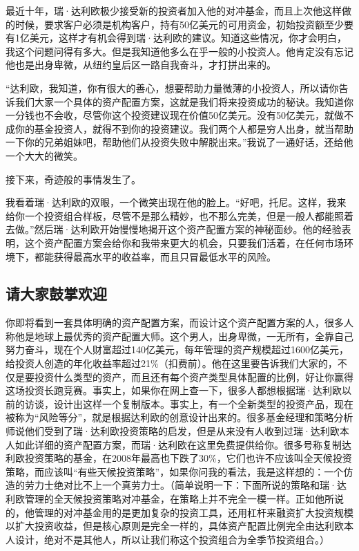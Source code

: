 最近十年，瑞·达利欧极少接受新的投资者加入他的对冲基金，而且上次他这样做的时候，要求客户必须是机构客户，持有50亿美元的可用资金，初始投资额至少要有1亿美元，这样才有机会得到瑞·达利欧的建议。知道这些情况，你才会明白，我这个问题问得有多大。但是我知道他多么在乎一般的小投资人。他肯定没有忘记他也是出身卑微，从纽约皇后区一路自我奋斗，才打拼出来的。

“达利欧，我知道，你有很大的善心，想要帮助力量微薄的小投资人，所以请你告诉我们大家一个具体的资产配置方案，这就是我们将来投资成功的秘诀。我知道你一分钱也不会收，尽管你这个投资建议现在价值50亿美元。没有50亿美元，就做不成你的基金投资人，就得不到你的投资建议。我们两个人都是穷人出身，就当帮助一下你的兄弟姐妹吧，帮助他们从投资失败中解脱出来。”我说了一通好话，还给他一个大大的微笑。

接下来，奇迹般的事情发生了。

我看着瑞·达利欧的双眼，一个微笑出现在他的脸上。“好吧，托尼。这样，我来给你一个投资组合样板，尽管不是那么精妙，也不那么完美，但是一般人都能照着去做。”然后瑞·达利欧开始慢慢地揭开这个资产配置方案的神秘面纱。他的经验表明，这个资产配置方案会给你和我带来更大的机会，只要我们活着，在任何市场环境下，都能获得最高水平的收益率，而且只冒最低水平的风险。

\subsection{请大家鼓掌欢迎}

你即将看到一套具体明确的资产配置方案，而设计这个资产配置方案的人，很多人称他是地球上最优秀的资产配置大师。这个男人，出身卑微，一无所有，全靠自己努力奋斗，现在个人财富超过140亿美元，每年管理的资产规模超过1600亿美元，给投资人创造的年化收益率超过21\%（扣费前）。他在这里要告诉我们大家的，不仅是要投资什么类型的资产，而且还有每个资产类型具体配置的比例，好让你赢得这场投资长跑竞赛。事实上，如果你在网上查一下，很多人都想根据瑞·达利欧以前的访谈，设计出这样一个复制版本。事实上，有一个全新类型的投资产品，现在被称为“风险等分”，就是根据达利欧的创意设计出来的。很多基金经理和策略分析师说他们受到了瑞·达利欧投资策略的启发，但是从来没有人收到过瑞·达利欧本人如此详细的资产配置方案，而瑞·达利欧在这里免费提供给你。很多号称复制达利欧投资策略的基金，在2008年最高也下跌了30\%，它们也许不应该叫全天候投资策略，而应该叫“有些天候投资策略”，如果你问我的看法，我是这样想的：一个仿造的劳力士绝对比不上一个真劳力士。（简单说明一下：下面所说的策略和瑞·达利欧管理的全天候投资策略对冲基金，在策略上并不完全一模一样。正如他所说的，他管理的对冲基金用的是更加复杂的投资工具，还用杠杆来融资扩大投资规模以扩大投资收益，但是核心原则是完全一样的，具体资产配置比例完全由达利欧本人设计，绝对不是其他人，所以让我们称这个投资组合为全季节投资组合。）

